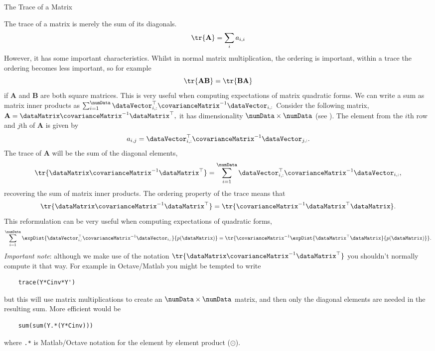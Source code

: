 \begin{boxfloat}
  \caption{The Trace of a Matrix}\label{box:trace}

  \boxfontsize The trace of a matrix is merely the sum of its
  diagonals.
  \[
  \tr{\mathbf{A}} = \sum_{i} a_{i,i}
  \]
  However, it has some important characteristics. Whilst in normal
  matrix multiplication, the ordering is important, within a trace the
  ordering becomes less important, so for example
  \[
  \tr{\mathbf{A}\mathbf{B}} = \tr{\mathbf{B}\mathbf{A}}
  \]
  if $\mathbf{A}$ and $\mathbf{B}$ are both square matrices. This is
  very useful when computing expectations of matrix quadratic
  forms. We can write a sum as matrix inner products as $
  \sum_{i=1}^\numData \dataVector_{i,
    :}^\top\covarianceMatrix^{-1}\dataVector_{i, :} $ Consider the
  following matrix, $ \mathbf{A} =
  \dataMatrix\covarianceMatrix^{-1}\dataMatrix^\top, $ it has
  dimensionality $\numData \times \numData$ (see
  ). The element from the $i$th row
  and $j$th of $\mathbf{A}$ is given by
  \[
  a_{i, j} = \dataVector_{i, :}^\top\covarianceMatrix^{-1}\dataVector_{j, :}.
  \]
  The trace of $\mathbf{A}$  will be the sum of the diagonal elements, 
  \[
  \tr{\dataMatrix\covarianceMatrix^{-1}\dataMatrix^\top } = \sum_{i=1}^\numData \dataVector_{i, :}^\top\covarianceMatrix^{-1}\dataVector_{i, :},
  \]
  recovering the sum of matrix inner products. The ordering property
  of the trace means that
  \[
  \tr{\dataMatrix\covarianceMatrix^{-1}\dataMatrix^\top } =
  \tr{\covarianceMatrix^{-1}\dataMatrix^\top\dataMatrix}.
  \]
  This reformulation can be very useful when computing expectations of
  quadratic forms,
  \[
  \sum_{i=1}^\numData \expDist{\dataVector_{i,
      :}^\top\covarianceMatrix^{-1}\dataVector_{i, :}}{p(\dataMatrix)}
  = \tr{\covarianceMatrix^{-1} \expDist{\dataMatrix^\top
      \dataMatrix}{p(\dataMatrix)}}.
  \]
  \emph{Important note}: although we make use of the notation
  $\tr{\dataMatrix\covarianceMatrix^{-1}\dataMatrix^\top}$ you
  shouldn't normally compute it that way. For example in Octave/Matlab
  you might be tempted to write \lstset{language=Matlab}
  \begin{lstlisting}
    trace(Y*Cinv*Y')
  \end{lstlisting}
  but this will use matrix multiplications to create an $\numData
  \times \numData$ matrix, and then only the diagonal elements are
  needed in the resulting sum.  More efficient would be
  \begin{lstlisting}
    sum(sum(Y.*(Y*Cinv)))
  \end{lstlisting}
  where \lstinline!.*! is Matlab/Octave notation for the element by
  element product ($\odot$). 
\end{boxfloat}

